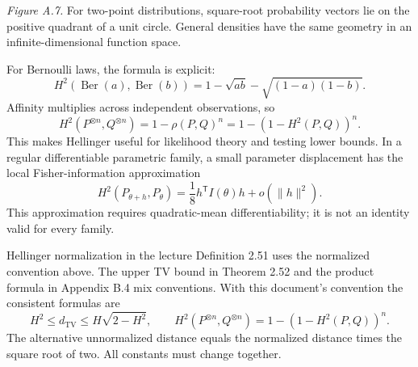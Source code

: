 \documentclass[12pt]{article}
\begin{document}
\begin{center}
\end{center}
\textit{Figure A.7.} For two-point distributions, square-root probability
vectors lie on the positive quadrant of a unit circle. General densities
have the same geometry in an infinite-dimensional function space.

For Bernoulli laws, the formula is explicit:
\begin{equation}
 H^2(\operatorname{Ber}(a),\operatorname{Ber}(b))
 =1-\sqrt{ab}-\sqrt{(1-a)(1-b)}.
\end{equation}
Affinity multiplies across independent observations, so
\begin{equation}
 H^2(P^{\otimes n},Q^{\otimes n})=1-\rho(P,Q)^n
 =1-(1-H^2(P,Q))^n.
\end{equation}
This makes Hellinger useful for likelihood theory and testing lower bounds.
In a regular differentiable parametric family, a small parameter displacement
has the local Fisher-information approximation
\begin{equation}
 H^2(P_{\theta+h},P_\theta)
 =\frac18h^{\mathsf T}I(\theta)h+o(\|h\|^2).
\end{equation}
This approximation requires quadratic-mean differentiability; it is not an
identity valid for every family.

\begin{correctionbox}{Hellinger normalization in the lecture}
Definition 2.51 uses the normalized convention above. The upper TV bound
in Theorem 2.52 and the product formula in Appendix B.4 mix conventions.
With this document's convention the consistent formulas are
\begin{equation}
 H^2\le d_{\mathrm{TV}}\le H\sqrt{2-H^2},\qquad
 H^2(P^{\otimes n},Q^{\otimes n})=1-(1-H^2(P,Q))^n.
\end{equation}
The alternative unnormalized distance equals the normalized distance times
the square root of two. All constants must change together.
\end{correctionbox}
\par\endgroup
\end{document}
